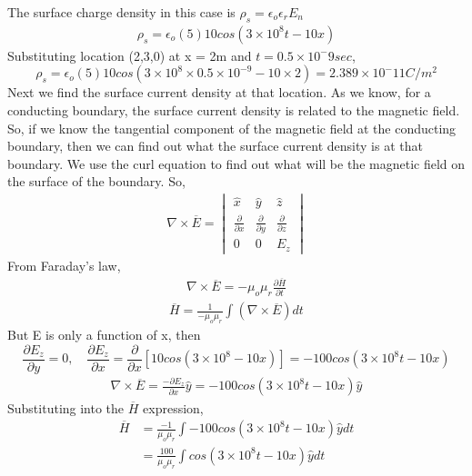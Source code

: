 \begin{exmp}
The surface charge density in this case is $\rho_s = \epsilon_o\epsilon_rE_n$
\begin{align*}
\rho_s = \epsilon_o(5)10cos(3\times10^8t - 10x)
\end{align*}
Substituting location (2,3,0) at x = 2m and $t = 0.5\times 10^-9sec$,
\begin{dmath*}
\rho_s = \epsilon_o(5)10cos(3\times 10^8\times 0.5\times10^{-9} - 10\times 2) = 2.389\times 10^-11 C/m^2
\end{dmath*}
Next we find the surface current density at that location. As we know, for a conducting boundary, the surface current density is related to the magnetic field. \\
So, if we know the tangential component of the magnetic field at the conducting boundary, then we can find out what the surface current density is at that boundary. We use the curl equation to find out what will be the magnetic field on the surface of the boundary. So,
\begin{align*}
\nabla\times \overline{E} = \begin{vmatrix}
\hat{x} &\hat{y} &\hat{z}\\
\frac{\partial}{\partial x} & \frac{\partial}{\partial y} & \frac{\partial}{\partial z} \\
0 &0 &E_z
\end{vmatrix}
\end{align*}
From Faraday's law,
\begin{align*}
\nabla\times\overline{E} = -\mu_o\mu_r\frac{\partial\overline{H}}{\partial t}
\end{align*}
\begin{align*}
\overline{H} = \frac{1}{-\mu_o\mu_r}\int (\nabla\times\overline{E})dt
\end{align*}
But E is only a function of x, then
\begin{dmath*}
\frac{\partial E_z}{\partial y} = 0,\quad \frac{\partial E_z}{\partial x} = \frac{\partial}{\partial x}\left[ 10cos(3\times 10^8 - 10x) \right] = -100cos(3\times 10^8 t - 10x)
\end{dmath*}
\begin{align*}
\nabla\times\overline{E} = \frac{-\partial E_z}{\partial x}\hat{y} = -100cos(3\times10^8t - 10x)\hat{y}
\end{align*}
Substituting into the $\overline{H}$ expression,
\begin{align*}
\overline{H} &= \frac{-1}{\mu_o\mu_r}\int-100cos(3\times 10^8t - 10x)\hat{y}dt \\
&=\frac{100}{\mu_o\mu_r}\int cos(3\times 10^8t - 10x)\hat{y}dt \\

\end{align*}
\end{exmp}
